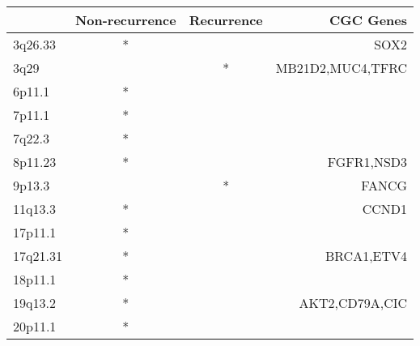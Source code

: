 \begin{tabular}{lccr}
\toprule
{} & Non-recurrence & Recurrence &         CGC Genes \\
\midrule
3q26.33  &              * &            &              SOX2 \\
3q29     &                &          * &  MB21D2,MUC4,TFRC \\
6p11.1   &              * &            &                   \\
7p11.1   &              * &            &                   \\
7q22.3   &              * &            &                   \\
8p11.23  &              * &            &        FGFR1,NSD3 \\
9p13.3   &                &          * &             FANCG \\
11q13.3  &              * &            &             CCND1 \\
17p11.1  &              * &            &                   \\
17q21.31 &              * &            &        BRCA1,ETV4 \\
18p11.1  &              * &            &                   \\
19q13.2  &              * &            &    AKT2,CD79A,CIC \\
20p11.1  &              * &            &                   \\
\bottomrule
\end{tabular}
